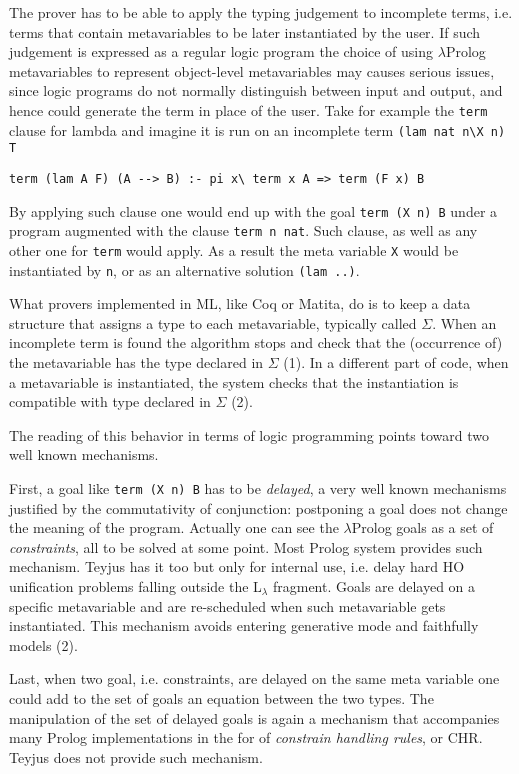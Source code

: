 \documentclass[preprint]{sigplanconf}
\begin{document}
The prover has to be able to apply the typing judgement to incomplete terms,
i.e. terms that contain metavariables to be later instantiated by the
user.  If such judgement is expressed as a regular logic program the choice
of using $\lambda$Prolog metavariables to represent object-level metavariables
may causes serious issues, since logic programs do not normally distinguish
between input and output, and hence could generate the term in place of the
user.  Take for example the \verb+term+ clause for lambda and imagine
it is run on an incomplete term \verb+(lam nat n\X n) T+

\begin{verbatim}
term (lam A F) (A --> B) :- pi x\ term x A => term (F x) B
\end{verbatim}

By applying such clause one would end up with the goal \verb+term (X n) B+
under a program augmented with the clause \verb+term n nat+.  Such
clause, as well as any other one for \verb+term+ would apply.  As a result
the meta variable \verb+X+ would be instantiated by \verb+n+, or as an
alternative solution \verb+(lam ..)+.

What provers implemented in ML, like Coq or Matita, do is to keep
a data structure that assigns a type to each metavariable, typically called
$\Sigma$.  When an incomplete term is found the algorithm stops and check
that the (occurrence of) the metavariable has the type declared in $\Sigma$ (1).
In a different part of code, when a metavariable is instantiated, the system
checks that the instantiation is compatible with type declared in $\Sigma$ (2).

The reading of this behavior in terms of logic programming points toward two
well known mechanisms.  

First, a goal like \verb+term (X n) B+ has to be
\emph{delayed}, a very well known mechanisms justified by the commutativity of
conjunction: postponing a goal does not change the meaning of the program.
Actually one can see the $\lambda$Prolog goals as a set of \emph{constraints},
all to be solved at some point.  Most Prolog system provides such mechanism.
Teyjus has it too but only for internal use, i.e. delay hard HO unification
problems falling outside the L$_\lambda$ fragment.  Goals are delayed on
a specific metavariable and are re-scheduled when such metavariable
gets instantiated.  This mechanism avoids entering generative mode and
faithfully models (2).

Last, when two goal, i.e. constraints, are delayed on the same meta variable
one could add to the set of goals an equation between the two types.  The
manipulation of the set of delayed goals is again a mechanism that accompanies
many Prolog implementations in the for of \emph{constrain handling rules},
or CHR.  Teyjus does not provide such mechanism.
\end{document}
